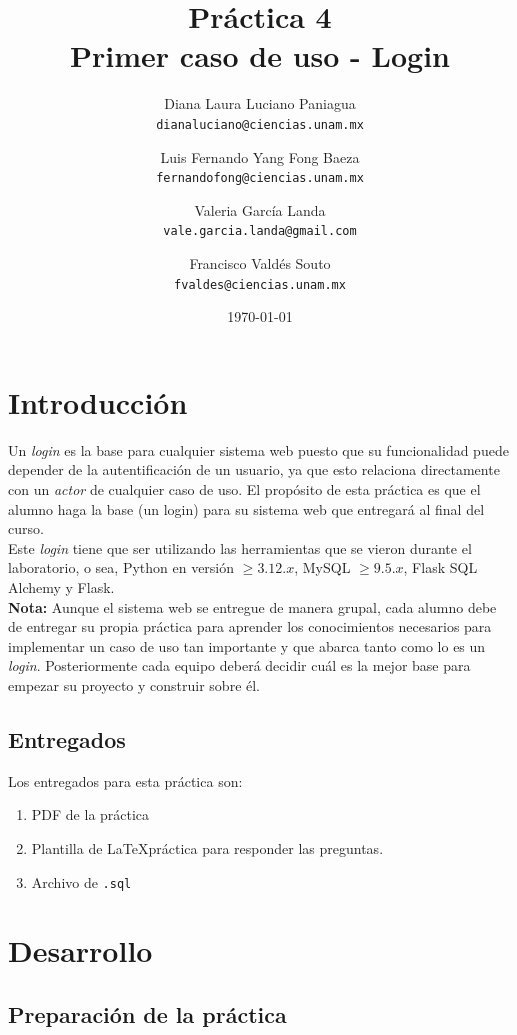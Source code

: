 \documentclass{article}
\title{Práctica 4\\Primer caso de uso - Login}
\author{
    Diana Laura Luciano Paniagua\\
    \texttt{dianaluciano@ciencias.unam.mx}
    \and
    Luis Fernando Yang Fong Baeza\\
    \texttt{fernandofong@ciencias.unam.mx}
    \and
    Valeria García Landa\\
    \texttt{vale.garcia.landa@gmail.com}
    \and
    Francisco Valdés Souto\\
    \texttt{fvaldes@ciencias.unam.mx}
}
\date{\today}
\begin{document}
\maketitle

\section{Introducción}

Un \textit{login} es la base para cualquier sistema web puesto que su funcionalidad puede depender de la autentificación de un usuario, ya que esto relaciona directamente con un \textit{actor} de cualquier caso de uso. El propósito de esta práctica es que el alumno haga la base (un login) para su sistema web que entregará al final del curso.\\

Este \textit{login} tiene que ser utilizando las herramientas que se vieron durante el laboratorio, o sea, Python en versión $\geq 3.12.x$, MySQL $\geq 9.5.x$, Flask SQL Alchemy y Flask.\\

\textbf{Nota:} Aunque el sistema web se entregue de manera grupal, cada alumno debe de entregar su propia práctica para aprender los conocimientos necesarios para implementar un caso de uso tan importante y que abarca tanto como lo es un \textit{login}. Posteriormente cada equipo deberá decidir cuál es la mejor base para empezar su proyecto y construir sobre él.

\subsection{Entregados}

Los entregados para esta práctica son:

\begin{enumerate}
\item PDF de la práctica 
\item Plantilla de \LaTeX práctica para responder las preguntas.
\item Archivo de \texttt{.sql}
\end{enumerate}

\section{Desarrollo}

\subsection{Preparación de la práctica}
\end{document}
